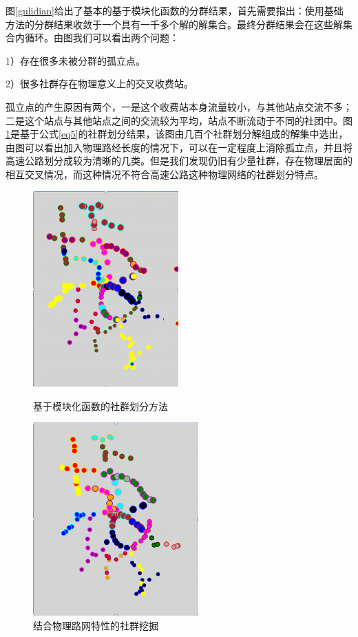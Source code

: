 		图\ref{gulidian}给出了基本的基于模块化函数的分群结果，首先需要指出：使用基础方法的分群结果收敛于一个具有一千多个解的解集合。最终分群结果会在这些解集合内循环。由图我们可以看出两个问题：

		1）存在很多未被分群的孤立点。

		2）很多社群存在物理意义上的交叉收费站。

		孤立点的产生原因有两个，一是这个收费站本身流量较小，与其他站点交流不多；二是这个站点与其他站点之间的交流较为平均，站点不断流动于不同的社团中。图\ref{fenqun2}是基于公式\ref{eq5}的社群划分结果，该图由几百个社群划分解组成的解集中选出，由图可以看出加入物理路经长度的情况下，可以在一定程度上消除孤立点，并且将高速公路划分成较为清晰的几类。但是我们发现仍旧有少量社群，存在物理层面的相互交叉情况，而这种情况不符合高速公路这种物理网络的社群划分特点。

				\begin{figure}
				\begin{minipage}{0.5\linewidth}
					\centering
					\includegraphics[width=2.2in]{picture/liuliangbianquan}
					\caption{基于模块化函数的社群划分方法}
					\label{fenqun1}
				\end{minipage}%
				\begin{minipage}{0.5\linewidth}
					\centering
					\includegraphics[width=2.5in]{picture/xiaochuguli}
					\caption{结合物理路网特性的社群挖掘}
					\label{fenqun2}
				\end{minipage}
				\end{figure}

